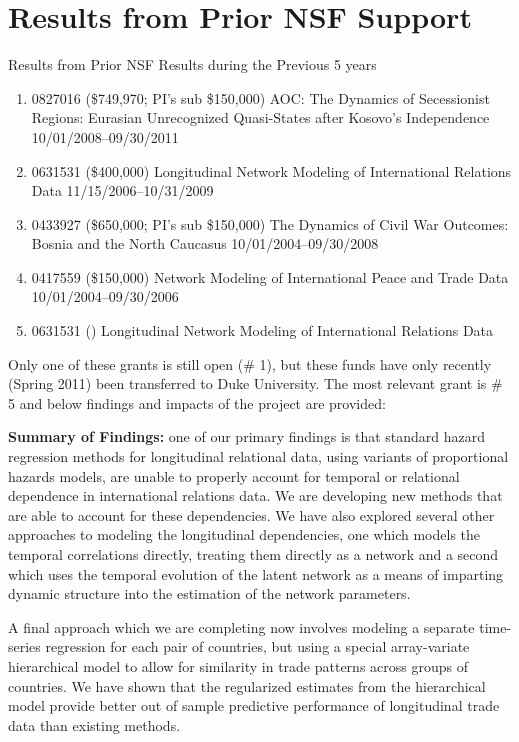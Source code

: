 \documentclass[pdftex,12pt,fullpage,oneside]{amsart}
\begin{document}
\section{Results from Prior NSF Support}

\noindent Results from Prior NSF Results during the Previous 5 years

\begin{enumerate}
\item  0827016 (\$749,970; PI's sub \$150,000) AOC: The Dynamics of Secessionist Regions: Eurasian Unrecognized Quasi-States after Kosovo's Independence 10/01/2008--09/30/2011

\item 0631531 (\$400,000) Longitudinal Network Modeling of International Relations Data 11/15/2006--10/31/2009

\item  0433927 (\$650,000; PI's sub \$150,000) The Dynamics of Civil War Outcomes: Bosnia and the North Caucasus 10/01/2004--09/30/2008

\item  0417559 (\$150,000) Network Modeling of International Peace and Trade Data 10/01/2004--09/30/2006 

\item 0631531 () Longitudinal Network Modeling of International Relations Data  
\end{enumerate}

Only one of these grants is still open (\# 1), but these funds have only recently (Spring 2011) been transferred to Duke University. The most relevant grant is \# 5 and below findings and impacts of the project are provided: 
\vspace{.1in}

\textbf{Summary of Findings:} one of our primary findings is that standard hazard regression methods for longitudinal relational data, using variants of proportional hazards models, are unable to properly account for temporal or relational dependence in international relations data. We are developing new methods that are able to account for these dependencies. We have also explored several other approaches to modeling the longitudinal dependencies, one which models the temporal correlations directly, treating them directly as a network and a second which uses the temporal evolution of the latent network as a means of imparting dynamic structure into the estimation of the network parameters. 

A final approach which we are completing now involves modeling a separate time-series regression for each pair of countries, but using a special array-variate hierarchical model to allow for similarity in trade patterns across groups of countries. We have shown that the regularized estimates from the hierarchical model provide better out of sample predictive performance of longitudinal trade data than existing methods. 
\end{document}
